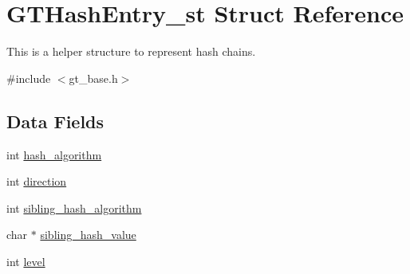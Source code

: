 \hypertarget{struct_g_t_hash_entry__st}{
\section{GTHashEntry\_\-st Struct Reference}
\label{struct_g_t_hash_entry__st}
}


This is a helper structure to represent hash chains.  




{\ttfamily \#include $<$gt\_\-base.h$>$}

\subsection*{Data Fields}
\begin{DoxyCompactItemize}
\item 
int \hyperlink{struct_g_t_hash_entry__st_a92fd2e8c617862d67872bf97ba554d92}{hash\_\-algorithm}
\item 
int \hyperlink{struct_g_t_hash_entry__st_aa710126c9daa5e9686235104531a85ce}{direction}
\item 
int \hyperlink{struct_g_t_hash_entry__st_a3c427767bec4dcd42f94cdd31f15663f}{sibling\_\-hash\_\-algorithm}
\item 
char $\ast$ \hyperlink{struct_g_t_hash_entry__st_ac3ad24df0b919ae386765db7250f29db}{sibling\_\-hash\_\-value}
\item 
int \hyperlink{struct_g_t_hash_entry__st_a9c98ea68db1b4e2ce8112d708feccc69}{level}
\end{DoxyCompactItemize}


